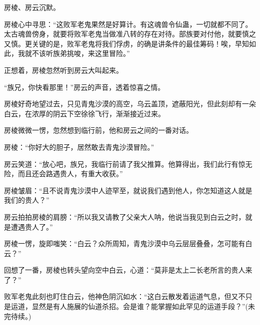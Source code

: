 \begin{this_body}
房棱、房云沉默。

房棱心中寻思：“这败军老鬼果然是好算计。有这魂兽令仙蛊，一切就都不同了。太古魂兽傍身，就要将败军老鬼当做准八转的存在对待。部族要对付他，就要慎之又慎。更关键的是，败军老鬼将我们俘虏，的确是讲条件的最佳筹码！唉，早知如此，我就不该听族弟挑唆，来这里冒险。”

正想着，房棱忽然听到房云大叫起来。

“族兄，你快看那里！”房云的声音，透着惊喜之情。

房棱好奇地望过去，只见青鬼沙漠的高空，乌云盖顶，遮蔽阳光，但此刻却有一朵白云，在浓厚的阴云下空徐徐飞行，渐渐接近过来。

房棱微微一愣，忽然想到临行前，他和房云之间的一番对话。

房棱：“你好大的胆子，居然敢去青鬼沙漠冒险。”

房云笑道：“放心吧，族兄，我临行前请了我父推算。他算得出，我们此行有惊无险，而且还会路遇贵人，有重大收获。”

房棱皱眉：“且不说青鬼沙漠中人迹罕至，就说我们遇到他人，你怎知道这人就是我们的贵人？”

房云拍拍房棱的肩膀：“所以我又请教了父亲大人呐，他说当我见到白云之时，就是遭遇贵人了。”

房棱一愣，旋即嗤笑：“白云？众所周知，青鬼沙漠中乌云层层叠叠，怎可能有白云？”

回想了一番，房棱也转头望向空中白云，心道：“莫非是太上二长老所言的贵人来了？”

败军老鬼此刻也盯住白云，他神色阴沉如水：“这白云散发着运道气息，但又不只是运道，显然是有人施展的仙道杀招。会是谁？能掌握如此罕见的运道手段？”(未完待续。)

\end{this_body}

